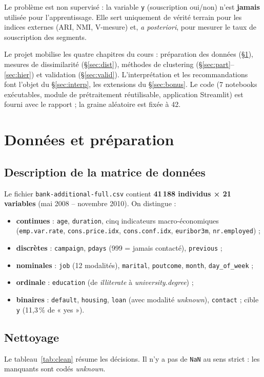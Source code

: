 \documentclass[11pt,a4paper]{article}
\begin{document}
Le problème est non supervisé : la variable \texttt{y} (souscription oui/non) n'est \textbf{jamais} utilisée pour l'apprentissage. Elle sert uniquement de vérité terrain pour les indices externes (ARI, NMI, V-mesure) et, \emph{a posteriori}, pour mesurer le taux de souscription des segments.

Le projet mobilise les quatre chapitres du cours : préparation des données (§\ref{sec:prep}), mesures de dissimilarité (§\ref{sec:dist}), méthodes de clustering (§\ref{sec:part}–\ref{sec:hier}) et validation (§\ref{sec:valid}). L'interprétation et les recommandations font l'objet du §\ref{sec:interp}, les extensions du §\ref{sec:bonus}. Le code (7 notebooks exécutables, module de prétraitement réutilisable, application Streamlit) est fourni avec le rapport ; la graine aléatoire est fixée à 42.

\section{Données et préparation}\label{sec:prep}
\subsection{Description de la matrice de données}
Le fichier \texttt{bank-additional-full.csv} contient \textbf{41\,188 individus × 21 variables} (mai 2008 – novembre 2010). On distingue :
\begin{itemize}
\item \textbf{continues} : \texttt{age}, \texttt{duration}, cinq indicateurs macro-économiques (\texttt{emp.var.rate}, \texttt{cons.price.idx}, \texttt{cons.conf.idx}, \texttt{euribor3m}, \texttt{nr.employed}) ;
\item \textbf{discrètes} : \texttt{campaign}, \texttt{pdays} (999 = jamais contacté), \texttt{previous} ;
\item \textbf{nominales} : \texttt{job} (12 modalités), \texttt{marital}, \texttt{poutcome}, \texttt{month}, \texttt{day\_of\_week} ;
\item \textbf{ordinale} : \texttt{education} (de \textit{illiterate} à \textit{university.degree}) ;
\item \textbf{binaires} : \texttt{default}, \texttt{housing}, \texttt{loan} (avec modalité \textit{unknown}), \texttt{contact} ; cible \texttt{y} (11,3\,\% de « yes »).
\end{itemize}

\subsection{Nettoyage}
Le tableau~\ref{tab:clean} résume les décisions. Il n'y a pas de \texttt{NaN} au sens strict : les manquants sont codés \textit{unknown}.
\end{document}
